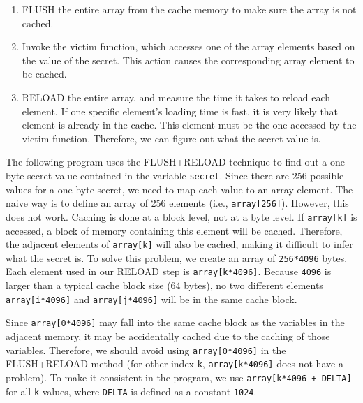 \begin{enumerate}[noitemsep]

\item FLUSH the entire array from the cache memory to make sure the array is not cached. 

\item Invoke the victim function, which accesses one of the array
elements based on the value of the secret. This action causes 
the corresponding array element to be cached. 

\item RELOAD the entire array, and measure the time it takes to reload 
each element. If one specific element's loading time is fast, 
it is very likely that element is already in the cache. 
This element must be the one accessed by the victim function. 
Therefore, we can figure out what the secret value is.
\end{enumerate}


The following program uses the FLUSH+RELOAD technique to 
find out a one-byte secret value contained in the variable \texttt{secret}. 
Since there are 256 possible values for a one-byte secret, we 
need to map each value to an array element. The naive way is to define an
array of 256 elements (i.e., \texttt{array[256]}).  However, this does not
work. Caching is done at a block level, not at a byte level. If
\texttt{array[k]} is accessed, a block of memory containing this element  
will be cached. Therefore, the adjacent elements of \texttt{array[k]} 
will also be cached, making it difficult to infer what the secret is. 
To solve this problem, we create an array of \texttt{256*4096} 
bytes. Each element used in our RELOAD step is \texttt{array[k*4096]}. 
Because \texttt{4096} is larger than a typical cache block size (64 bytes), 
no two different elements \texttt{array[i*4096]} and \texttt{array[j*4096]} will
be in the same cache block.

Since \texttt{array[0*4096]} may fall into the same cache block as the variables 
in the adjacent memory, it may be accidentally cached due to the caching 
of those variables. Therefore, we should avoid using \texttt{array[0*4096]} in
the FLUSH+RELOAD method (for other index \texttt{k}, \texttt{array[k*4096]} does not
have a problem).
To make it consistent in the program, we use 
\texttt{array[k*4096 + DELTA]} for all \texttt{k} values, 
where \texttt{DELTA} is defined as a constant \texttt{1024}. 


